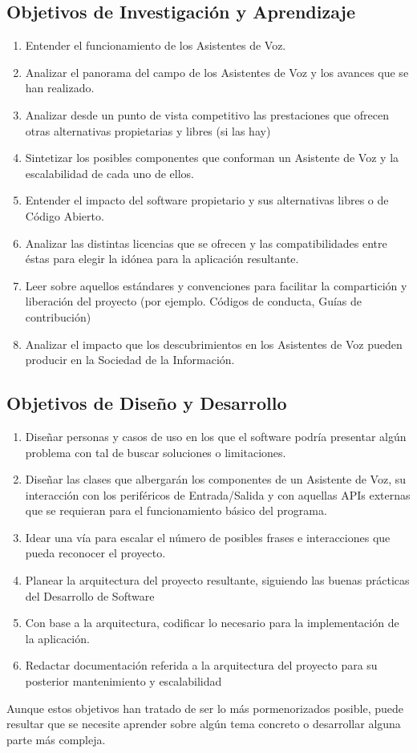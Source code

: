 \subsection{Objetivos de Investigación y Aprendizaje}

\begin{enumerate}[O-{IA}.1 -]
	\item Entender el funcionamiento de los Asistentes de Voz.
	\item Analizar el panorama del campo de los Asistentes de Voz y los avances que se han realizado.
	\item Analizar desde un punto de vista competitivo las prestaciones que ofrecen otras alternativas propietarias y libres (si las hay)
	\item Sintetizar los posibles componentes que conforman un Asistente de Voz y la escalabilidad de cada uno de ellos.
	\item Entender el impacto del software propietario y sus alternativas libres o de Código Abierto.
	\item Analizar las distintas licencias que se ofrecen y las compatibilidades entre éstas para elegir la idónea para la aplicación resultante.
	\item Leer sobre aquellos estándares y convenciones para facilitar la compartición y liberación del proyecto (por ejemplo. Códigos de conducta, Guías de contribución)
	\item Analizar el impacto que los descubrimientos en los Asistentes de Voz pueden producir en la Sociedad de la Información.
\end{enumerate}

\subsection{Objetivos de Diseño y Desarrollo}

\begin{enumerate}[O-DD.1 -]
	\item Diseñar personas y casos de uso en los que el software podría presentar algún problema con tal de buscar soluciones o limitaciones.
	\item Diseñar las clases que albergarán los componentes de un Asistente de Voz, su interacción con los periféricos de Entrada/Salida y con aquellas APIs externas que se requieran para el funcionamiento básico del programa.
	\item Idear una vía para escalar el número de posibles frases e interacciones que pueda reconocer el proyecto.
	\item Planear la arquitectura del proyecto resultante, siguiendo las buenas prácticas del Desarrollo de Software
	\item Con base a la arquitectura, codificar lo necesario para la implementación de la aplicación.
	\item Redactar documentación referida a la arquitectura del proyecto para su posterior mantenimiento y escalabilidad
	
\end{enumerate}

Aunque estos objetivos han tratado de ser lo más pormenorizados posible, puede resultar que se necesite aprender sobre algún tema concreto o desarrollar alguna parte más compleja.

